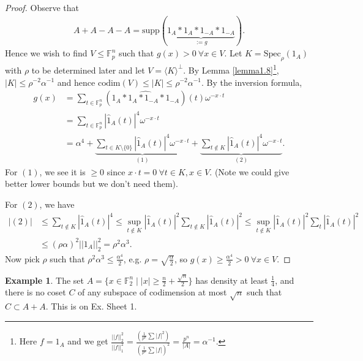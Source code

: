 \documentclass{article}
\theoremstyle{definition}
\newtheorem{example}[theorem]{Example}
\begin{document}
\begin{proof}
    Observe that 
    \begin{align*}
        A+A-A-A = \text{supp}(\underbrace{1_A * 1_A * 1_{-A} * 1_{-A}}_{:= g}).
    \end{align*}
    Hence we wish to find $V \le \mathbb{F}_p^n$ such that $g(x) > 0 ~\forall x \in V$. Let $K = \text{Spec}_{\rho}(1_A)$ with $\rho$ to be determined later and let $V = \langle K \rangle^{\perp}$. By Lemma \ref{lemma1.8}\footnote{Here $f = 1_A$ and we get $\frac{||f||_2^2}{||f||_1^2} = \frac{\left(\frac{1}{p^n}\sum_{}^{} |f|^2\right)}{\left(\frac{1}{p^n}\sum_{}^{} |f|\right)^2} = \frac{p^n}{|A|} = \alpha^{-1}$.}, $|K|\le \rho^{-2}\alpha^{-1}$ and hence $\text{codim}(V)\le |K| \le \rho^{-2}\alpha^{-1}$. By the inversion formula, 
    \begin{align*}
        g(x) &= \sum_{t \in \mathbb{F}_p^n}^{} (\widehat{1_A * 1_A * 1_{-A} * 1_{-A}})(t)\omega^{-x\cdot t} \\
        &= \sum_{t \in \mathbb{F}_p^n}^{} |\hat{1}_A(t)|^4 \omega^{-x\cdot t} \\
        &= \alpha^4 + \underbrace{\sum_{t \in K \setminus \{0\}}^{} |\hat{1}_A(t)|^4 \omega^{-x \cdot t}}_{(1)} + \underbrace{\sum_{t \not\in K}^{} |\hat{1}_A(t)|^4 \omega^{-x \cdot t}}_{(2)}.
    \end{align*}
    For $(1)$, we see it is $\ge 0$ since $x \cdot t = 0 ~\forall t \in K, x \in V$. (Note we could give better lower bounds but we don't need them).
    \vspace{1mm}
     
    For $(2)$, we have 
    \begin{align*}
        |(2)| &\le \sum_{t \not\in K}^{} |\hat{1}_A(t)|^4 \le \sup_{t \not\in K} |\hat{1}_A(t)|^2 \sum_{t \not\in K}^{} |\hat{1}_A(t)|^2 \le \sup_{t \not\in K} |\hat{1}_A(t)|^2 \sum_{t}^{} |\hat{1}_A(t)|^2 \\
        &\le (\rho \alpha)^2 ||1_A||_2^2 = \rho^2 \alpha^3.
    \end{align*}
    Now pick $\rho$ such that $\rho^2 \alpha^3 \le \frac{\alpha^4}{2}$, e.g. $\rho = \sqrt{\frac{\alpha}{2}}$, so $g(x) \ge \frac{\alpha^4}{2}>0 ~\forall x \in V$.
\end{proof}
\begin{example}
    The set $A = \{x \in \mathbb{F}_2^n \mid |x|\ge \frac{n}{2}+\frac{\sqrt{n}}{2}\}$ has density at least $\frac{1}{4}$, and there is no coset $C$ of any subspace of codimension at most $\sqrt{n}$ such that $C \subset A + A$. This is on Ex. Sheet 1.
\end{example}
\end{document}
